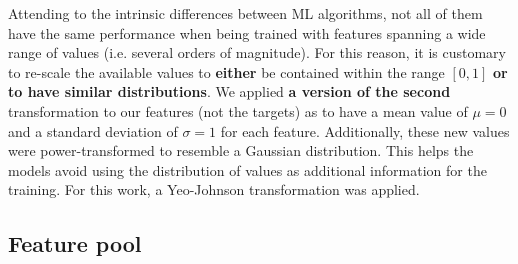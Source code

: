 \documentclass{aa}
\begin{document}
\begin{table}
\setlength{\tabcolsep}{3pt}
\caption{Composition of initial catalogue and number of cross matches with additional surveys and catalogues.}             %
\label{table:composition_catalogue}      %
\centering                          %
\end{table}

Attending to the intrinsic differences between ML algorithms, not all of them have the same performance when being trained with features spanning a wide range of values (i.e. several orders of magnitude). For this reason, it is customary to re-scale the available values to \textbf{either} be contained within the range $[0, 1]$ \textbf{or to have similar distributions}. We applied \textbf{a version of the second} transformation to our features (not the targets) as to have a mean value of $\mu = 0$ and a standard deviation of $\sigma = 1$ for each feature. Additionally, these new values were power-transformed to resemble a Gaussian distribution. This helps the models avoid using the distribution of values as additional information for the training. For this work, a Yeo-Johnson transformation \citep{10.1093/biomet/87.4.954} was applied.


\subsection{Feature pool}\label{sec:feature_creation}
\end{document}
